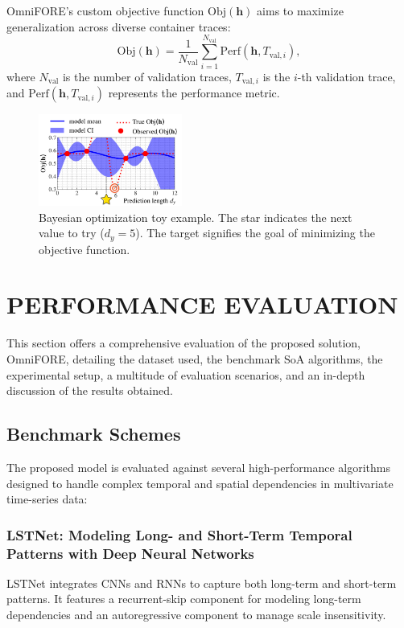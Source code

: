\documentclass{ieeetmlcn}
\begin{document}
OmniFORE's custom objective function $\text{Obj}(\mathbf{h})$ aims to maximize generalization across diverse container traces:
\begin{equation}
    \text{Obj}(\mathbf{h}) = \frac{1}{N_{\text{val}}} \sum_{i=1}^{N_{\text{val}}} \text{Perf}(\mathbf{h}, T_{\text{val}, i}),
\end{equation}
where $N_{\text{val}}$ is the number of validation traces, $T_{\text{val}, i}$ is the $i$-th validation trace, and $\text{Perf}(\mathbf{h}, T_{\text{val}, i})$ represents the performance metric.

\begin{figure}
\centering
\includegraphics[width=0.42\textwidth]{img/gp_toy_example.pdf}
\caption{Bayesian optimization toy example. The star indicates the next value to try ($d_y = 5$). The target signifies the goal of minimizing the objective function.}
\label{fig:gp_toy_example}
\end{figure}

\section{PERFORMANCE EVALUATION}
\label{sec: Performance Evaluation}

This section offers a comprehensive evaluation of the proposed solution, OmniFORE, detailing the dataset used, the benchmark SoA algorithms, the experimental setup, a multitude of evaluation scenarios, and an in-depth discussion of the results obtained.

\subsection{Benchmark Schemes}

The proposed model is evaluated against several high-performance algorithms designed to handle complex temporal and spatial dependencies in multivariate time-series data:

\subsubsection*{\textbf{LSTNet: Modeling Long- and Short-Term Temporal Patterns with Deep Neural Networks \cite{LSTNet}}}
LSTNet integrates CNNs and RNNs to capture both long-term and short-term patterns. It features a recurrent-skip component for modeling long-term dependencies and an autoregressive component to manage scale insensitivity.
\end{document}
